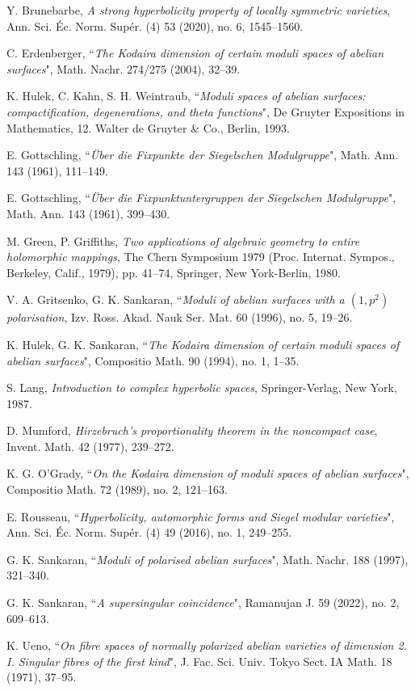 \documentclass[12pt, pdftex]{amsart}
\theoremstyle{plain}
\theoremstyle{definition}
\numberwithin{equation}{section}
\begin{document}
\begin{thebibliography}{99}

Y. Brunebarbe, 
\textit{A strong hyperbolicity property of locally symmetric varieties},
Ann. Sci. Éc. Norm. Supér. (4) 53 (2020), no. 6, 1545–1560.

C. Erdenberger,
``\textit{The Kodaira dimension of certain moduli spaces of abelian surfaces}",
Math. Nachr. 274/275 (2004), 32–39.

K. Hulek, C. Kahn, S. H. Weintraub, 
``\textit{Moduli spaces of abelian surfaces: compactification, degenerations, and theta functions}",
De Gruyter Expositions in Mathematics, 12. Walter de Gruyter \& Co., Berlin, 1993.

E. Gottschling,
``\textit{Über die Fixpunkte der Siegelschen Modulgruppe}",
Math. Ann. 143 (1961), 111–149.

E. Gottschling,
``\textit{Über die Fixpunktuntergruppen der Siegelschen Modulgruppe}",
Math. Ann. 143 (1961), 399–430.

M. Green,  P. Griffiths, 
\textit{Two applications of algebraic geometry to entire holomorphic mappings},
The Chern Symposium 1979 (Proc. Internat. Sympos., Berkeley, Calif., 1979), pp. 41–74, Springer, New York-Berlin, 1980.

V. A. Gritsenko, G. K. Sankaran, 
``\textit{Moduli of abelian surfaces with a $(1,p^2)$ polarisation},
Izv. Ross. Akad. Nauk Ser. Mat. 60 (1996), no. 5, 19–26.

K. Hulek, G. K. Sankaran,
``\textit{The Kodaira dimension of certain moduli spaces of abelian surfaces}",
Compositio Math. 90 (1994), no. 1, 1–35.

S. Lang,
\textit{Introduction to complex hyperbolic spaces},
Springer-Verlag, New York, 1987.

D. Mumford,
\textit{Hirzebruch's proportionality theorem in the noncompact case},
Invent. Math. 42 (1977), 239–272.

K. G. O'Grady,
``\textit{On the Kodaira dimension of moduli spaces of abelian surfaces}",
Compositio Math. 72 (1989), no. 2, 121–163.

E. Rousseau,
``\textit{Hyperbolicity, automorphic forms and Siegel modular varieties}",
Ann. Sci. Éc. Norm. Supér. (4) 49 (2016), no. 1, 249–255.

G. K. Sankaran, 
``\textit{Moduli of polarised abelian surfaces}",
Math. Nachr. 188 (1997), 321–340.

G. K. Sankaran,
``\textit{A supersingular coincidence}",
Ramanujan J. 59 (2022), no. 2, 609–613.

K. Ueno, 
``\textit{On fibre spaces of normally polarized abelian varieties of dimension 2. I. Singular fibres of the first kind}",
J. Fac. Sci. Univ. Tokyo Sect. IA Math. 18 (1971), 37–95.

\end{thebibliography}
\end{document}
